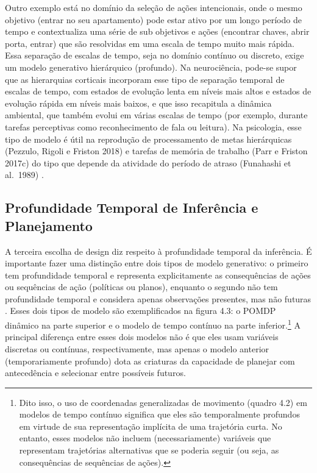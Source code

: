 \documentclass[
  12pt,
]{book}
\begin{document}
Outro exemplo está no domínio da seleção de ações intencionais, onde o mesmo objetivo (entrar no seu apartamento) pode estar ativo por um longo período de tempo e contextualiza uma série de sub objetivos e ações (encontrar chaves, abrir porta, entrar) que são resolvidas em uma escala de tempo muito mais rápida. Essa separação de escalas de tempo, seja no domínio contínuo ou discreto, exige um modelo generativo hierárquico (profundo). Na neurociência, pode-se supor que as hierarquias corticais incorporam esse tipo de separação temporal de escalas de tempo, com estados de evolução lenta em níveis mais altos e estados de evolução rápida em níveis mais baixos, e que isso recapitula a dinâmica ambiental, que também evolui em várias escalas de tempo (por exemplo, durante tarefas perceptivas como reconhecimento de fala ou leitura). Na psicologia, esse tipo de modelo é útil na reprodução de processamento de metas hierárquicas (Pezzulo, Rigoli e Friston 2018) e tarefas de memória de trabalho (Parr e Friston 2017c) do tipo que depende da atividade do período de atraso (Funahashi et al.~1989) .

\hypertarget{profundidade-temporal-de-inferuxeancia-e-planejamento}{%
\subsection{Profundidade Temporal de Inferência e Planejamento}\label{profundidade-temporal-de-inferuxeancia-e-planejamento}}

A terceira escolha de design diz respeito à profundidade temporal da inferência. É importante fazer uma distinção entre dois tipos de modelo generativo: o primeiro tem profundidade temporal e representa explicitamente as consequências de ações ou sequências de ação (políticas ou planos), enquanto o segundo não tem profundidade temporal e considera apenas observações presentes, mas não futuras . Esses dois tipos de modelo são exemplificados na figura 4.3: o POMDP dinâmico na parte superior e o modelo de tempo contínuo na parte inferior.\footnote{\hspace{0pt}Dito isso, o uso de coordenadas generalizadas de movimento (quadro 4.2) em modelos de tempo contínuo significa que eles são temporalmente profundos em virtude de sua representação implícita de uma trajetória curta. No entanto, esses modelos não incluem (necessariamente) variáveis que representam trajetórias alternativas que se poderia seguir (ou seja, as consequências de sequências de ações).} A principal diferença entre esses dois modelos não é que eles usam variáveis discretas ou contínuas, respectivamente, mas apenas o modelo anterior (temporariamente profundo) dota as criaturas da capacidade de planejar com antecedência e selecionar entre possíveis futuros.
\end{document}
